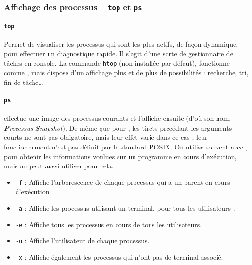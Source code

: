 \subsubsection{Affichage des processus -- \texttt{top} et \texttt{ps}}

\paragraph{\texttt{top}} 
Permet de visualiser les processus qui sont les plus actifs, de façon dynamique, pour effectuer un diagnostique rapide. Il s'agit d'une sorte de gestionnaire de tâches en console.\newline
{} La commande \texttt{htop} (non installée par défaut), fonctionne comme , mais dispose d'un affichage plus et de plus de possibilités : recherche, tri, fin de tâche\dots

\paragraph{\texttt{ps}} 
 effectue une image des processus courants et l'affiche ensuite (d'où son nom, \textit{\textbf{P}rocessus \textbf{S}napshot}). De même que pour , les tirets précédant les arguments courts ne sont pas obligatoire, mais leur effet varie dans ce cas ; leur fonctionnement n'est pas définit par le standard POSIX.
On utilise souvent  avec , pour obtenir les informations voulues sur un programme en cours d'exécution, mais on peut aussi utiliser  pour cela.
\begin{itemize}
    \item \texttt{-f} : Affiche l'arborescence de chaque processus qui a un parent en cours d'exécution.
    \item \texttt{-a} : Affiche les processus utilisant un terminal, pour tous les utilisateurs .
    \item \texttt{-e} : Affiche tous les processus en cours de tous les utilisateurs.
    \item \texttt{-u} : Affiche l'utilisateur de chaque processus.
    \item \texttt{-x} : Affiche également les processus qui n'ont pas de terminal associé.
\end{itemize}

